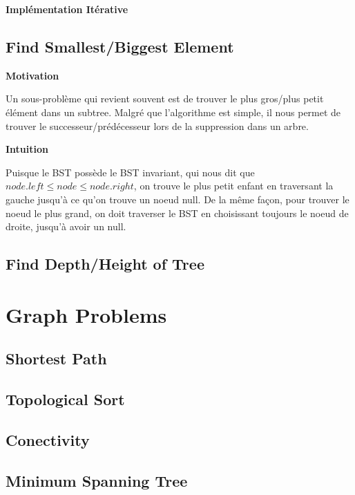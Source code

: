 \documentclass{article}
\begin{document}
\textbf{Implémentation Itérative}

\subsection{Find Smallest/Biggest Element}%
\label{sub:Find Smallest/Biggest Element}

\textbf{Motivation}

Un sous-problème qui revient souvent est de trouver le plus gros/plus
petit élément dans un subtree. Malgré que l'algorithme est simple, il
nous permet de trouver le successeur/prédécesseur lors de la suppression
dans un arbre.

\textbf{Intuition}

Puisque le BST possède le BST invariant, qui nous dit que $ node.left \leq
node \leq node.right $, on trouve le plus petit enfant en traversant la
gauche jusqu'à ce qu'on trouve un noeud null. De la même façon, pour trouver
le noeud le plus grand, on doit traverser le BST en choisissant toujours
le noeud de droite, jusqu'à avoir un null.

\subsection{Find Depth/Height of Tree}%
\label{sub:Find Depth/Height of Tree}

\section{Graph Problems}%
\label{sec:Graph Problems}

\subsection{Shortest Path}%
\label{sub:Shortest Path}

\subsection{Topological Sort}%
\label{sub:Topological Sort}

\subsection{Conectivity}%
\label{sub:Conectivity}

\subsection{Minimum Spanning Tree}%
\label{sub:Minimum Spanning Tree}
\end{document}
